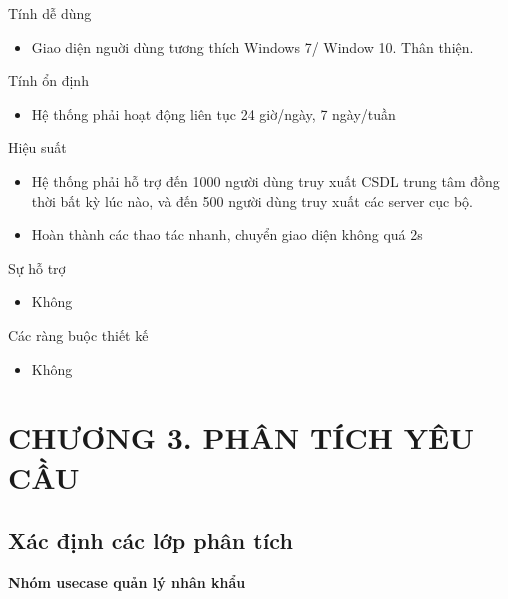 \documentclass{article}
\begin{document}
Tính dễ dùng
\begin{itemize}
    \item Giao diện nguời dùng tương thích Windows 7/ Window 10. Thân thiện.
\end{itemize}

Tính ổn định
\begin{itemize}
    \item Hệ thống phải hoạt động liên tục 24 giờ/ngày, 7 ngày/tuần
\end{itemize}

Hiệu suất
\begin{itemize}
    \item Hệ thống phải hỗ trợ đến 1000 người dùng truy xuất CSDL trung tâm đồng thời bất kỳ lúc nào, và đến 500 người dùng truy xuất các server cục bộ. 
    \item Hoàn thành các thao tác nhanh, chuyển giao diện không quá 2s
\end{itemize}

Sự hỗ trợ
\begin{itemize}
    \item Không
\end{itemize}

Các ràng buộc thiết kế
\begin{itemize}
    \item Không
\end{itemize}
\newpage
\section*{CHƯƠNG 3. PHÂN TÍCH YÊU CẦU}
\setcounter{section}{3}
\setcounter{subsection}{0}
\subsection{Xác định các lớp phân tích}
\textbf{Nhóm usecase quản lý nhân khẩu}



\end{document}

